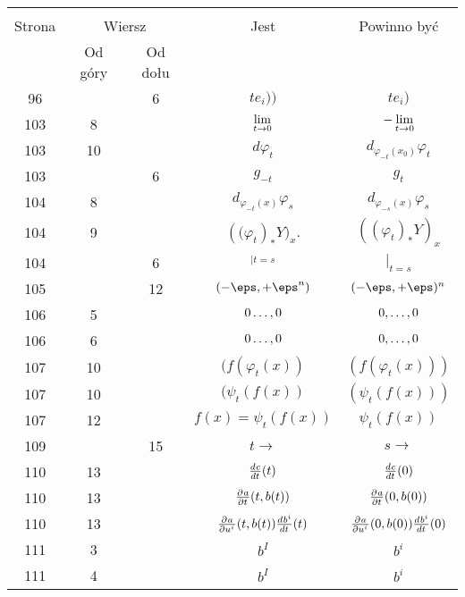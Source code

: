 \documentclass[a4paper,11pt]{article}
\begin{document}
\begin{center}
  \begin{tabular}{|c|c|c|c|c|}
    \hline
    & \multicolumn{2}{c|}{} & & \\
    Strona & \multicolumn{2}{c|}{Wiersz} & Jest
                              & Powinno być \\ \cline{2-3}
    & Od góry & Od dołu & & \\
    \hline
    96  & &  6 & $t e_{ i } ))$ & $t e_{ i } )$ \\
    103 &  8 & & $\lim\limits_{ \substack{ t \to 0 } }$
           & $-\lim\limits_{ \substack{ t \to 0 } }$ \\
    103 & 10 & & $d \varphi_{ t }$ & $d_{ \varphi_{ -t }( x_{ 0 } ) } \varphi_{ t }$ \\
    103 & & 6 & $g_{ -t }$ & $g_{ t }$ \\
    104 &  8 & & $d_{ \varphi_{ -t }( x ) } \varphi_{ s }$
           & $d_{ \varphi_{ -s }( x ) } \varphi_{ s }$ \\
    104 &  9 & & $( \big( \varphi_{ t } )_{*} Y \big)_{ x }$.
           & $( ( \varphi_{ t } )_{ * } Y )_{ x }$ \\
    104 & &  6 & $_{ | t = s }$ & $|_{ t = s }$ \\
    105 & & 12 & $( - \eps, + \eps^{ n } )$ & $( -\eps, +\eps )^{ n }$ \\
    106 &  5 & & $0\ldots, 0$ & $0, \ldots, 0$ \\
    106 &  6 & & $0\ldots, 0$ & $0, \ldots, 0$ \\
    107 & 10 & & $( f( \varphi_{ t }( x ) )$ & $( f( \varphi_{ t }( x ) ) )$ \\
    107 & 10 & & $( \psi_{ t } ( f( x ) )$ & $( \psi_{ t } ( f( x ) ) )$ \\
    107 & 12 & & $f( x ) = \psi_{ t } ( f( x ) )$
           & $\psi_{ t } ( f( x ) )$ \\
    109 & & 15 & $t \to$ & $s \to$ \\
    110 & 13 & & $\frac{ d^{   } {  c  } }{ d {  t  }^{   } }( t )$ & $\frac{ d^{   } {  c  } }{ d {  t  }^{   } }( 0 )$ \\
    110 & 13 & & $\frac{ \partial^{   } {  a  } }{ \partial {  t  }^{   } }( t, b( t ) )$
           & $\frac{ \partial^{   } {  a  } }{ \partial {  t  }^{   } }( 0, b( 0 ) )$ \\
    110 & 13 & & $\frac{ \partial^{   } {  a  } }{ \partial {  { u^{ i } }  }^{   } }( t, b( t ) )
                 \frac{ d^{   } {  { b^{ i } }  } }{ d {  t  }^{   } }( t )$
           & $\frac{ \partial^{   } {  a  } }{ \partial {  { u^{ i } }  }^{   } }( 0, b( 0 ) )
             \frac{ d^{   } {  { b^{ i } }  } }{ d {  t  }^{   } }( 0 )$ \\
    111 &  3 & & $b^{ I }$ & $b^{ i }$ \\
    111 &  4 & & $b^{ I }$ & $b^{ i }$ \\

\end{tabular}
\end{center}
\end{document}
